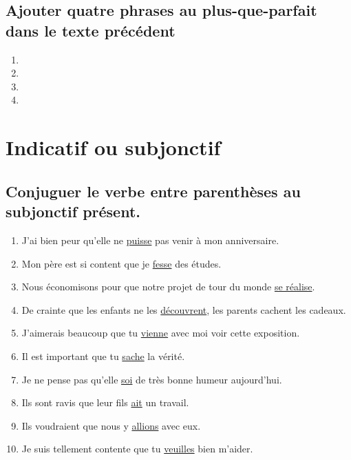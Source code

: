\documentclass[12pt]{article}
\newcommand{\und}[1]{\underline{#1}}
\begin{document}
\subsection{Ajouter quatre phrases au plus-que-parfait dans le texte précédent}
\begin{enumerate}
	\item
	\item
	\item
	\item
\end{enumerate}


\section{Indicatif ou subjonctif}
\subsection{Conjuguer le verbe entre parenthèses au subjonctif présent.}
\begin{enumerate}
	\item J’ai bien peur qu’elle ne \und{puisse} pas venir à mon anniversaire.
	\item Mon père est si content que je \und{fesse} des études.
	\item Nous économisons pour que notre projet de tour du monde \und{se réalise}.
	\item De crainte que les enfants ne les \und{découvrent}, les parents cachent les cadeaux.
	\item J’aimerais beaucoup que tu \und{vienne} avec moi voir cette exposition.
	\item Il est important que tu \und{sache} la vérité.
	\item Je ne pense pas qu’elle \und{soi} de très bonne humeur aujourd'hui.
	\item Ils sont ravis que leur fils \und{ait} un travail.
	\item Ils voudraient que nous y \und{allions} avec eux.
	\item Je suis tellement contente que tu \und{veuilles} bien m’aider.
\end{enumerate}
\end{document}
